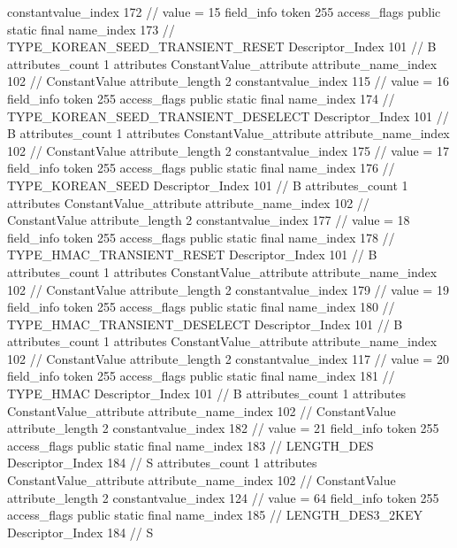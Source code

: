 {{{{{{{					constantvalue_index	172		// value = 15
				}
				}
			}
			field_info {
				token	255
				access_flags	public static final
				name_index	173		// TYPE_KOREAN_SEED_TRANSIENT_RESET
				Descriptor_Index	101		// B
				attributes_count	1
				attributes {
				ConstantValue_attribute {
					attribute_name_index	102		// ConstantValue
					attribute_length	2
					constantvalue_index	115		// value = 16
				}
				}
			}
			field_info {
				token	255
				access_flags	public static final
				name_index	174		// TYPE_KOREAN_SEED_TRANSIENT_DESELECT
				Descriptor_Index	101		// B
				attributes_count	1
				attributes {
				ConstantValue_attribute {
					attribute_name_index	102		// ConstantValue
					attribute_length	2
					constantvalue_index	175		// value = 17
				}
				}
			}
			field_info {
				token	255
				access_flags	public static final
				name_index	176		// TYPE_KOREAN_SEED
				Descriptor_Index	101		// B
				attributes_count	1
				attributes {
				ConstantValue_attribute {
					attribute_name_index	102		// ConstantValue
					attribute_length	2
					constantvalue_index	177		// value = 18
				}
				}
			}
			field_info {
				token	255
				access_flags	public static final
				name_index	178		// TYPE_HMAC_TRANSIENT_RESET
				Descriptor_Index	101		// B
				attributes_count	1
				attributes {
				ConstantValue_attribute {
					attribute_name_index	102		// ConstantValue
					attribute_length	2
					constantvalue_index	179		// value = 19
				}
				}
			}
			field_info {
				token	255
				access_flags	public static final
				name_index	180		// TYPE_HMAC_TRANSIENT_DESELECT
				Descriptor_Index	101		// B
				attributes_count	1
				attributes {
				ConstantValue_attribute {
					attribute_name_index	102		// ConstantValue
					attribute_length	2
					constantvalue_index	117		// value = 20
				}
				}
			}
			field_info {
				token	255
				access_flags	public static final
				name_index	181		// TYPE_HMAC
				Descriptor_Index	101		// B
				attributes_count	1
				attributes {
				ConstantValue_attribute {
					attribute_name_index	102		// ConstantValue
					attribute_length	2
					constantvalue_index	182		// value = 21
				}
				}
			}
			field_info {
				token	255
				access_flags	public static final
				name_index	183		// LENGTH_DES
				Descriptor_Index	184		// S
				attributes_count	1
				attributes {
				ConstantValue_attribute {
					attribute_name_index	102		// ConstantValue
					attribute_length	2
					constantvalue_index	124		// value = 64
				}
				}
			}
			field_info {
				token	255
				access_flags	public static final
				name_index	185		// LENGTH_DES3_2KEY
				Descriptor_Index	184		// S
}}}}}
